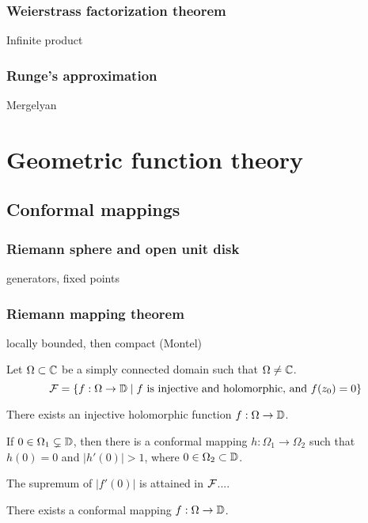 \documentclass{../note}
\begin{document}
\section{Weierstrass factorization theorem}
Infinite product

\section{Runge's approximation}
Mergelyan









\part{Geometric function theory}

\chapter{Conformal mappings}
\section{Riemann sphere and open unit disk}
\begin{prb}
\end{prb}
\begin{prb}
generators,
fixed points
\end{prb}
\begin{prb}
\end{prb}

\section{Riemann mapping theorem}


\begin{prb}
locally bounded, then compact (Montel)
\end{prb}
\begin{prb}
Let $\Omega\subset\mathbb{C}$ be a simply connected domain such that $\Omega\ne\mathbb{C}$.
\[\mathcal{F}=\{f:\Omega\to\mathbb{D}\mid f\text{ is injective and holomorphic, and }f(z_0)=0\}\]
\begin{parts}
\item There exists an injective holomorphic function $f:\Omega\to\mathbb{D}$.
\item If $0\in\Omega_1\subsetneq\mathbb{D}$, then there is a conformal mapping $h:\Omega_1\to\Omega_2$ such that $h(0)=0$ and $|h'(0)|>1$, where $0\in\Omega_2\subset\mathbb{D}$.
\item The supremum of $|f'(0)|$ is attained in $\mathcal{F}$....
\item There exists a conformal mapping $f:\Omega\to\mathbb{D}$.
\end{parts}
\end{prb}
\end{document}
